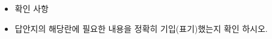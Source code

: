 \documentclass[10pt]{article}
\begin{document}
\begin{itemize}
  \item 확인 사항
\end{itemize}

\begin{itemize}
  \item 답안지의 해당란에 필요한 내용을 정확히 기입(표기)했는지 확인 하시오.
\end{itemize}
\end{document}
